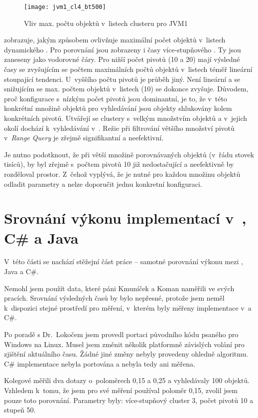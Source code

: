 \begin{figure}[t]
\centering
\texttt{[image: jvm1\_cl4\_bt500]}
\caption{Vliv max. počtu objektů v~listech clusteru pro JVM1}
\label{fig:jvm1cl4_bt500}
\end{figure}

 zobrazuje, jakým způsobem ovlivňuje maximální počet objektů v~listech dynamického .
Pro porovnání jsou zobrazeny i časy více-stupňového .
Ty jsou zaneseny jako vodorovné čáry.
Pro nižší počet pivotů (10 a 20) mají výsledné časy se zvyšujícím se počtem maximálních počtů objektů v~listech téměř lineární stoupající tendenci.
U~vyššího počtu pivotů je průběh jiný.
Není lineární a se snižujícím se max. počtem objektů v~listech (10) se dokonce zvyšuje.
Důvodem, proč konfigurace s~nízkým počet pivotů jsou dominantní, je to, že v~této konkrétní množině objektů pro vyhledávání jsou objekty shlukovány kolem konkrétních pivotů.
Utvářejí se clustery s~velkým množstvím objektů a v~jejich okolí dochází k~vyhledávání v~\BPTree{}.
Režie při filtrování většího množství pivotů v~\emph{Range Query} je zřejmě signifikantní a neefektivní.

Je nutno podotknout, že při větší množině porovnávaných objektů (v~řádu stovek tisíců), by byl zřejmě \MIndex{} s~počtem pivotů 10 již nedostačující a neefektivně by rozděloval prostor.
Z~čehož vyplývá, že je nutné pro každou množinu objektů odladit parametry  a nelze doporučit jednu konkretní konfiguraci.

\section{Srovnání výkonu implementací v~{\protect \CC}, C\# a Java}
V~této části se nachází stěžejní část práce -- samotné porovnání výkonu \MIndex{} mezi \CC, Java a C\#.

Nemohl jsem použít data, které páni Kmuníček a Koman naměřili ve svých pracích\cite{Kmunicek2011thesis}\cite{Koman2012thesis}.
Srovnání výsledných časů by bylo nepřesné, protože jsem neměl k~dispozici stejné prostředí pro měření, v~kterém byly měřeny implementace v~\CC a C\#.

Po poradě s Dr.~Lokočem jsem provedl portaci původního kódu \CC psaného pro Windows na Linux.
Musel jsem změnit několik platformně závislých volání pro zjištění aktuálního času.
Žádné jiné změny nebyly provedeny ohledně algoritmu.
C\# implementace nebyla portována a nebyla tedy ani měřena.

Kolegové měřili dva dotazy o~poloměrech 0,15 a 0,25 a vyhledávaly 100 objektů.
Vzhledem k~tomu, že jsem pro své měření používal poloměr 0,15, zvolil jsem pouze toto porovnání.
Parametry  byly: více-stupňový cluster 3, počet pivotů 10 a stupeň \BPTree{} 50.

